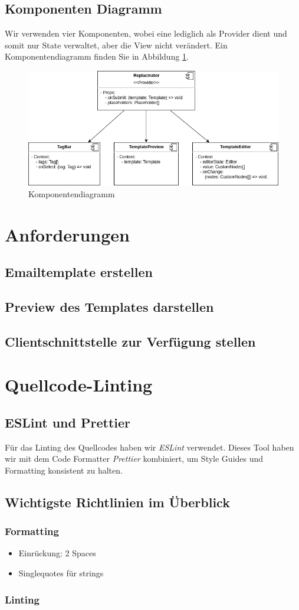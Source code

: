 \documentclass[a4paper, titlepage]{article}
\begin{document}
  \subsection{Komponenten Diagramm}
  Wir verwenden vier Komponenten, wobei eine lediglich
  als Provider dient und somit nur State verwaltet,
  aber die View nicht verändert. Ein Komponentendiagramm
  finden Sie in Abbildung \ref{component-diagram}.
  \begin{figure}
    \includegraphics[width=\textwidth]{images/react-replacinator.png}
    \caption{Komponentendiagramm}
    \label{component-diagram}
  \end{figure}
  \section{Anforderungen}
  \subsection{Emailtemplate erstellen}
  \subsection{Preview des Templates darstellen}
  \subsection{Clientschnittstelle zur Verfügung stellen}
  \subsection{}
  \section{Quellcode-Linting}
  \subsection{ESLint und Prettier}
  Für das Linting des Quellcodes haben wir \emph{ESLint} verwendet.
  Dieses Tool haben wir mit dem Code Formatter \emph{Prettier}
  kombiniert, um Style Guides und Formatting konsistent
  zu halten.
  \subsection{Wichtigste Richtlinien im Überblick}
  \subsubsection{Formatting}
  \begin{itemize}
    \item Einrückung: 2 Spaces
    \item Singlequotes für strings
  \end{itemize}
  \subsubsection{Linting}
\end{document}
